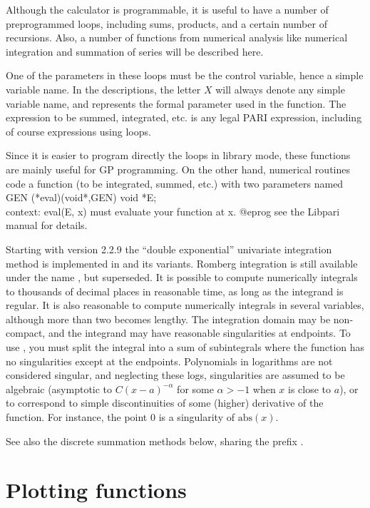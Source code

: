 Although the  calculator is programmable, it is useful to have
a number of preprogrammed loops, including sums, products, and a certain
number of recursions. Also, a number of functions from numerical analysis
like numerical integration and summation of series will be described here.

One of the parameters in these loops must be the control variable, hence a
simple variable name. In the descriptions, the letter $X$ will always denote
any simple variable name, and represents the formal parameter used in the
function. The expression to be summed, integrated, etc. is any legal PARI
expression, including of course expressions using loops.

Since it is easier to program directly the loops in library mode, these
functions are mainly useful for GP programming. On the other hand, numerical
routines code a function (to be integrated, summed, etc.) with two parameters
named
\bprog
  GEN (*eval)(void*,GEN)
  void *E;  \\ context: eval(E, x) must evaluate your function at x.
@eprog\noindent
see the Libpari manual for details.

Starting with version 2.2.9 the ``double exponential'' univariate
integration method is implemented in  and its variants. Romberg
integration is still available under the name , but
superseded. It is possible to compute numerically integrals to thousands of
decimal places in reasonable time, as long as the integrand is regular. It is
also reasonable to compute numerically integrals in several variables,
although more than two becomes lengthy. The integration domain may be
non-compact, and the integrand may have reasonable singularities at
endpoints. To use , you must split the integral into a sum
of subintegrals where the function has no singularities except at the
endpoints. Polynomials in logarithms are not considered singular, and
neglecting these logs, singularities are assumed to be algebraic (asymptotic
to $C(x-a)^{-\alpha}$ for some $\alpha > -1$ when $x$ is
close to $a$), or to correspond to simple discontinuities of some (higher)
derivative of the function. For instance, the point $0$ is a singularity of
$\text{abs}(x)$.

See also the discrete summation methods below, sharing the prefix .


\section{Plotting functions}

